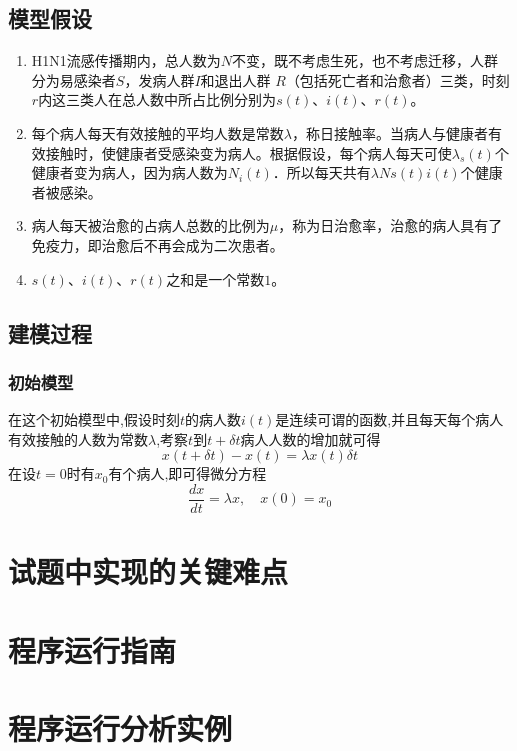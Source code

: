 \documentclass[supercite]{HustGraduPaper}
\begin{document}
	\subsection{模型假设}
	\begin{enumerate}
		\item H1N1流感传播期内，总人数为$N$不变，既不考虑生死，也不考虑迁移，人群分为易感染者$S$，发病人群$I$和退出人群 $R$（包括死亡者和治愈者）三类，时刻$r$内这三类人在总人数中所占比例分别为$s(t)$、$i(t)$、$r(t)$。
		\item 每个病人每天有效接触的平均人数是常数$\lambda$，称日接触率。当病人与健康者有效接触时，使健康者受感染变为病人。根据假设，每个病人每天可使$\lambda_s(t)$个健康者变为病人，因为病人数为$N_i(t)$．所以每天共有$\lambda N s(t) i(t)$个健康者被感染。
		\item 病人每天被治愈的占病人总数的比例为$\mu$，称为日治愈率，治愈的病人具有了免疫力，即治愈后不再会成为二次患者。
		\item $s(t)$、$i(t)$、$r(t)$之和是一个常数$1$。
	\end{enumerate}

	\subsection{建模过程}
	\subsubsection{初始模型}
	在这个初始模型中,假设时刻$t$的病人数$i(t)$是连续可谓的函数,并且每天每个病人有效接触的人数为常数$\lambda$,考察$t$到$t+\delta t$病人人数的增加就可得$$x(t+\delta t)-x(t) = \lambda x(t) \delta t$$
	在设$t = 0$时有$x_0$有个病人,即可得微分方程$$\frac{dx}{dt} = \lambda x, \quad x(0)=x_0$$


	\section{试题中实现的关键难点}

	\section{程序运行指南}

	\section{程序运行分析实例}


	\nocite{*}

	
\end{document}
